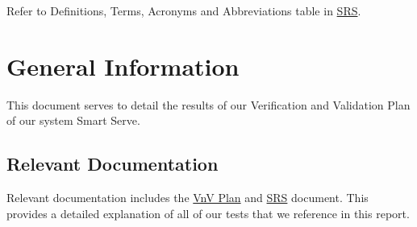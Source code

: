 \documentclass[12pt, titlepage]{article}
\begin{document}
Refer to Definitions, Terms, Acronyms and Abbreviations table in \href{https://github.com/purefisher/Smart-Serve/blob/main/docs/SRS/SRS.pdf}{SRS}.
\newpage
{}
\section{General Information}
This document serves to detail the results of our Verification and Validation Plan of our system Smart Serve.  

\subsection{Relevant Documentation}
Relevant documentation includes the \href{https://github.com/purefisher/Smart-Serve/blob/main/docs/VnVPlan/VnVPlan.pdf}{VnV Plan} and \href{https://github.com/purefisher/Smart-Serve/blob/main/docs/SRS/SRS.pdf}{SRS} document. This provides a detailed explanation of all of our tests that we reference in this report.

\newpage
\end{document}
